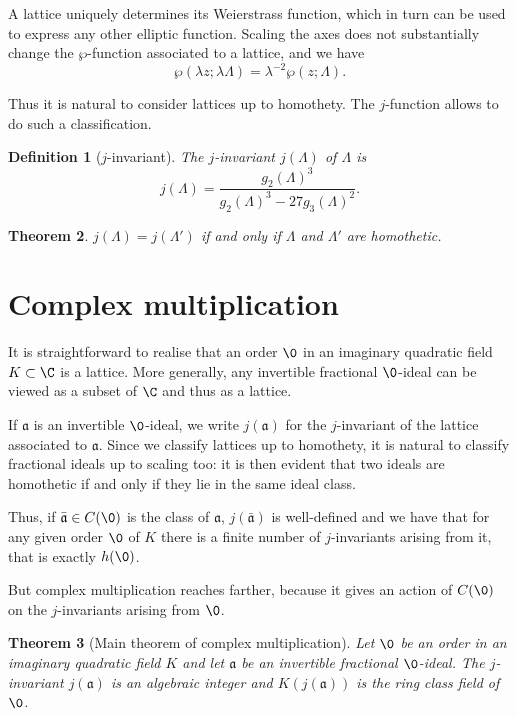 \documentclass{article}
\newcommand{\mf}{\mathfrak}
\newtheorem{theorem}{Theorem}
\newtheorem{definition}[theorem]{Definition}
\begin{document}
A lattice uniquely determines its Weierstrass function, which in turn
can be used to express any other elliptic function. Scaling the axes
does not substantially change the $\wp$-function associated to a
lattice, and we have
\begin{equation}
  \label{eq:6}
  \wp(\lambda z; \lambda\Lambda) = \lambda^{-2}\wp(z;\Lambda).
\end{equation}

Thus it is natural to consider lattices up to homothety. The
$j$-function allows to do such a classification.

\begin{definition}[$j$-invariant]
  The $j$-invariant $j(\Lambda)$ of $\Lambda$ is
  \[j(\Lambda) = \frac{g_2(\Lambda)^3}{g_2(\Lambda)^3 - 27g_3(\Lambda)^2}.\]
\end{definition}

\begin{theorem}
  $j(\Lambda)=j(\Lambda')$ if and only if $\Lambda$ and $\Lambda'$ are
  homothetic.
\end{theorem}


\section{Complex multiplication}

It is straightforward to realise that an order $\0$ in an imaginary
quadratic field $K\subset\C$ is a lattice. More generally, any
invertible fractional $\0$-ideal can be viewed as a subset of $\C$ and
thus as a lattice.

If $\mf{a}$ is an invertible $\0$-ideal, we write $j(\mf{a})$ for the
$j$-invariant of the lattice associated to $\mf{a}$. Since we classify
lattices up to homothety, it is natural to classify fractional ideals
up to scaling too: it is then evident that two ideals are homothetic
if and only if they lie in the same ideal class.

Thus, if $\bar{\mf{a}}\in C(\0)$ is the class of $\mf{a}$,
$j(\bar{\mf{a}})$ is well-defined and we have that for any given order
$\0$ of $K$ there is a finite number of $j$-invariants arising from
it, that is exactly $h(\0)$.

But complex multiplication reaches farther, because it gives an action
of $C(\0)$ on the $j$-invariants arising from $\0$.

\begin{theorem}[Main theorem of complex multiplication]
  Let $\0$ be an order in an imaginary quadratic field $K$ and let
  $\mf{a}$ be an invertible fractional $\0$-ideal. The $j$-invariant
  $j(\mf{a})$ is an algebraic integer and $K(j(\mf{a}))$ is the ring
  class field of $\0$.
\end{theorem}
\end{document}
